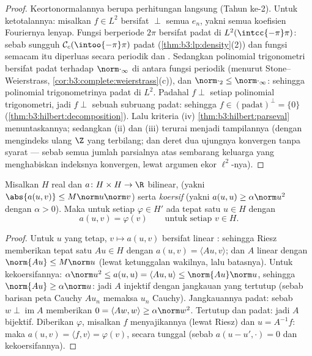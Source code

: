 \begin{proof}
Keortonormalannya berupa perhitungan langsung (Tahun ke-2). Untuk ketotalannya: misalkan
$f \in L^2$ bersifat $\perp$ semua $e_n$, yakni semua koefisien
Fouriernya lenyap. Fungsi  berperiode $2\pi$ bersifat
padat di $L^2(\intcc{-\pi}\pi)$: sebab sungguh $\mathcal
C_c(\intoo{-\pi}\pi)$ padat
(\cref{thm:b3:lp:density}(2)) dan fungsi semacam itu diperluas
secara periodik dan . Sedangkan polinomial trigonometri bersifat
padat terhadap $\norm\cdot_\infty$ di antara fungsi periodik 
(menurut Stone--Weierstrass, \cref{cor:b3:complete:weierstrass}(c)),
dan $\norm\cdot_2 \leq \norm\cdot_\infty$: sehingga polinomial
trigonometrinya padat di $L^2$. Padahal $f \perp$ setiap
polinomial trigonometri, jadi $f \perp$ sebuah subruang padat: sehingga $f
\in (\text{padat})^\perp = \{0\}$
(\cref{thm:b3:hilbert:decomposition}). Lalu kriteria (iv)
\cref{thm:b3:hilbert:parseval} menuntaskannya; sedangkan (ii) dan (iii)
terurai menjadi tampilannya (dengan mengindeks ulang $\Z$ yang terbilang; dan
deret dua ujungnya konvergen tanpa syarat --- sebab semua jumlah
parsialnya atas sembarang keluarga yang menghabiskan indeksnya konvergen, lewat argumen ekor $\ell^2$-nya).
\end{proof}

\begin{theorem}\label{thm:b3:hilbert:laxmilgram}
Misalkan $H$  real dan $a \colon H\times H \to
\R$ bilinear, \emph{} (yakni $\abs{a(u,v)} \leq M\norm
u\norm v$) serta \emph{koersif} (yakni $a(u, u) \geq \alpha\norm u^2$
dengan $\alpha > 0$). Maka untuk setiap $\varphi \in H'$ ada
tepat satu $u \in H$ dengan
\[
a(u, v) = \varphi(v) \qquad \text{untuk setiap } v \in H .
\]
\end{theorem}

\begin{proof}
Untuk $u$ yang tetap, $v \mapsto a(u, v)$ bersifat linear : sehingga Riesz
memberikan tepat satu $Au \in H$ dengan $a(u,v) = \langle Au,
v\rangle$; dan $A$ linear dengan $\norm{Au} \leq M\norm u$
(lewat ketunggalan wakilnya, lalu batasnya). Untuk kekoersifannya:
$\alpha\norm u^2 \leq a(u,u) = \langle Au, u\rangle \leq
\norm{Au}\norm u$, sehingga $\norm{Au} \geq \alpha\norm u$: jadi $A$
injektif dengan jangkauan yang tertutup (sebab barisan peta Cauchy $Au_n$
memaksa $u_n$ Cauchy). Jangkauannya padat: sebab $w \perp
\operatorname{im}A$ memberikan $0 = \langle Aw, w\rangle \geq
\alpha\norm w^2$. Tertutup dan padat: jadi $A$ bijektif. Diberikan
$\varphi$, misalkan $f$ menyajikannya (lewat Riesz) dan $u = A^{-1}f$:
maka $a(u, v) = \langle f, v\rangle = \varphi(v)$, secara tunggal
(sebab $a(u - u', \cdot) = 0$ dan kekoersifannya).
\end{proof}


